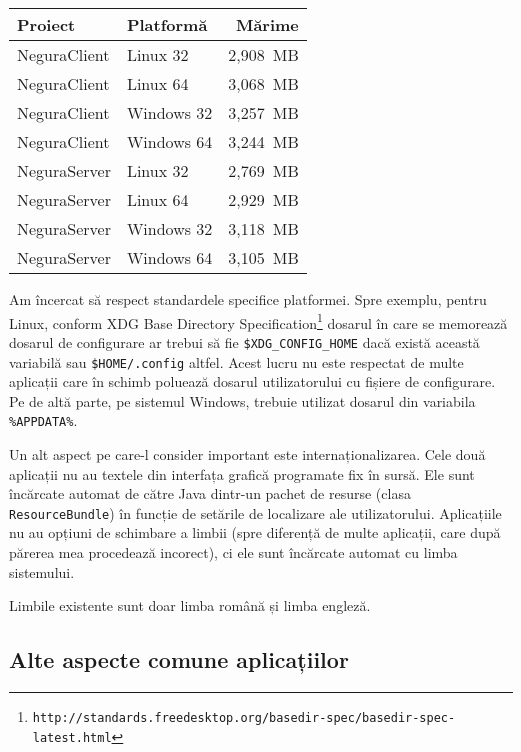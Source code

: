 \documentclass[a4wide,12pt]{report}
\newcommand{\cod}[1]{\texttt{#1}}
\newcommand{\url}[1]{\texttt{#1}}
\newcommand{\acr}[1]{{\textsmaller[1]{\textsc{#1}}}} %
\begin{document}
\begin{center}
    \begin{tabular}{l l r}
        Proiect      & Platformă  & Mărime \acr{JAR} \\
        \hline
        NeguraClient & Linux 32   &         2,908~MB \\
        NeguraClient & Linux 64   &         3,068~MB \\
        NeguraClient & Windows 32 &         3,257~MB \\
        NeguraClient & Windows 64 &         3,244~MB \\
        NeguraServer & Linux 32   &         2,769~MB \\
        NeguraServer & Linux 64   &         2,929~MB \\
        NeguraServer & Windows 32 &         3,118~MB \\
        NeguraServer & Windows 64 &         3,105~MB \\
    \end{tabular}
\end{center}

Am încercat să respect standardele specifice platformei. Spre exemplu, pentru Linux, conform XDG Base Directory
Specification\footnote{\url{http://standards.freedesktop.org/basedir-spec/basedir-spec-latest.html}} dosarul în care se
memorează dosarul de configurare ar trebui să fie \cod{\$XDG\_CONFIG\_HOME} dacă există această variabilă sau
\cod{\$HOME/.config} altfel. Acest lucru nu este respectat de multe aplicații care în schimb poluează dosarul
utilizatorului cu fișiere de configurare. Pe de altă parte, pe sistemul Windows, trebuie utilizat dosarul din variabila
\cod{\%APPDATA\%}.

Un alt aspect pe care-l consider important este internaționalizarea. Cele două aplicații nu au textele din interfața
grafică programate fix în sursă. Ele sunt încărcate automat de către Java dintr-un pachet de resurse (clasa
\cod{ResourceBundle}) în funcție de setările de localizare ale utilizatorului. Aplicațiile nu au opțiuni de schimbare a
limbii (spre diferență de multe aplicații, care după părerea mea procedează incorect), ci ele sunt încărcate automat cu
limba sistemului. 

Limbile existente sunt doar limba română și limba engleză.

\subsection{Alte aspecte comune aplicațiilor} %
\end{document}
